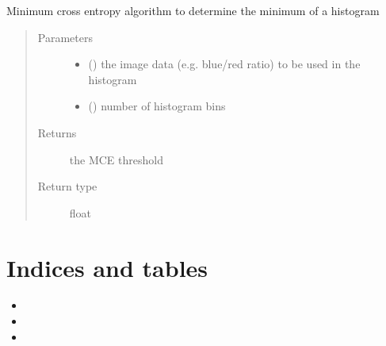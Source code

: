 \documentclass[letterpaper,10pt,english]{sphinxmanual}
\begin{document}

\begin{fulllineitems}
\label{\detokenize{thresholds:thresholds.min_cross_entropy}}
Minimum cross entropy algorithm to determine the minimum of a histogram
\begin{quote}\begin{description}
\item[{Parameters}] \leavevmode\begin{itemize}
\item {} 
 () \textendash{} the image data (e.g. blue/red ratio) to be used in the histogram

\item {} 
 () \textendash{} number of histogram bins

\end{itemize}

\item[{Returns}] \leavevmode
the MCE threshold

\item[{Return type}] \leavevmode
float

\end{description}\end{quote}

\end{fulllineitems}



\chapter{Indices and tables}
\label{\detokenize{index:indices-and-tables}}\begin{itemize}
\item {} 

\item {} 

\item {} 

\end{itemize}
\end{document}
